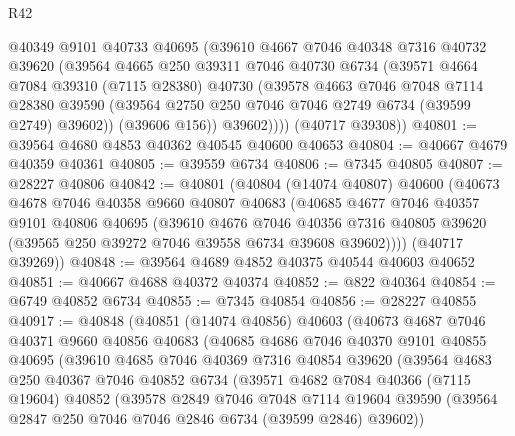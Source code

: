 \begin{lexlean}{R42}
\begin{coremodule}
{          @40349
          @9101
          @40733
          @40695
          (@39610
            @4667
            @7046
            @40348
            @7316
            @40732
            @39620
            (@39564
              @4665
              @250
              @39311
              @7046
              @40730
              @6734
              (@39571
                @4664
                @7084
                @39310
                (@7115 @28380)
                @40730
                (@39578
                  @4663
                  @7046
                  @7048
                  @7114
                  @28380
                  @39590
                  (@39564 @2750 @250 @7046 @7046 @2749 @6734 (@39599 @2749) @39602))
                (@39606 @156))
              @39602))))
      (@40717 @39308))
@40801 := @39564 @4680 @4853 @40362 @40545 @40600 @40653
@40804 := @40667 @4679 @40359 @40361
@40805 := @39559 @6734
@40806 := @7345 @40805
@40807 := @28227 @40806
@40842 := @40801
    (@40804
      (@14074 @40807)
      @40600
      (@40673
        @4678
        @7046
        @40358
        @9660
        @40807
        @40683
        (@40685
          @4677
          @7046
          @40357
          @9101
          @40806
          @40695
          (@39610
            @4676
            @7046
            @40356
            @7316
            @40805
            @39620
            (@39565 @250 @39272 @7046 @39558 @6734 @39608 @39602))))
      (@40717 @39269))
@40848 := @39564 @4689 @4852 @40375 @40544 @40603 @40652
@40851 := @40667 @4688 @40372 @40374
@40852 := @822 @40364
@40854 := @6749 @40852 @6734
@40855 := @7345 @40854
@40856 := @28227 @40855
@40917 := @40848
    (@40851
      (@14074 @40856)
      @40603
      (@40673
        @4687
        @7046
        @40371
        @9660
        @40856
        @40683
        (@40685
          @4686
          @7046
          @40370
          @9101
          @40855
          @40695
          (@39610
            @4685
            @7046
            @40369
            @7316
            @40854
            @39620
            (@39564
              @4683
              @250
              @40367
              @7046
              @40852
              @6734
              (@39571
                @4682
                @7084
                @40366
                (@7115 @19604)
                @40852
                (@39578
                  @2849
                  @7046
                  @7048
                  @7114
                  @19604
                  @39590
                  (@39564 @2847 @250 @7046 @7046 @2846 @6734 (@39599 @2846) @39602))
}
\end{coremodule}
\end{lexlean}
